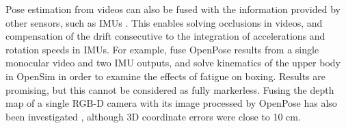 Pose estimation from videos can also be fused with the information provided by other sensors, such as IMUs \cite{Bao2022, Zhang2020}. This enables solving occlusions in videos, and compensation of the drift consecutive to the integration of accelerations and rotation speeds in IMUs. For example, \cite{Haralabidis2020} fuse OpenPose results from a single monocular video and two IMU outputs, and solve kinematics of the upper body in OpenSim in order to examine the effects of fatigue on boxing. Results are promising, but this cannot be considered as fully markerless. Fusing the depth map of a single RGB-D camera with its image processed by OpenPose has also been investigated \cite{Liu2022c}, although 3D coordinate errors were close to 10 cm.


\begin{table}
	\centering
\end{table}
